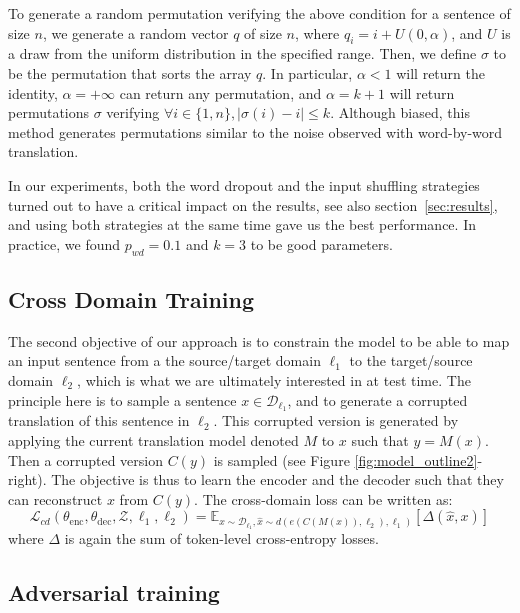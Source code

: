 \documentclass{article} \usepackage{iclr2018_conference,times}
\begin{document}
To generate a random permutation verifying the above condition for a sentence of size $n$, we generate a random vector $q$ of size $n$, where $q_i = i + U(0, \alpha)$, and $U$ is a draw from the uniform distribution in the specified range. Then, we define $\sigma$ to be the permutation that sorts the array $q$. In particular, $\alpha < 1$ will return the identity, $\alpha = +\infty$ can return any permutation, and $\alpha = k + 1$ will return permutations $\sigma$ verifying $\forall i \in \{1, n\}, | \sigma (i) - i | \leq k$. Although biased, this method generates permutations similar to the noise observed with word-by-word translation.

In our experiments, both the word dropout and the input shuffling strategies turned out to have a critical impact on the results, see also section~\ref{sec:results}, and using both strategies at the same time gave us the best performance. In practice, we found $p_{wd}=0.1$ and $k=3$ to be good parameters.

\subsection{Cross Domain Training}

 The second objective of our approach is to constrain the model to be able to map an input sentence from a the source/target domain $\ell_1$ to the target/source domain $\ell_2$, which is what we are ultimately interested in at test time. The principle here is to sample a sentence $x \in \mathcal{D}_{\ell_1}$, and to generate a corrupted translation of this sentence in $\ell_2$. This corrupted version is generated by applying the current translation model denoted $M$ to $x$ such that $y=M(x)$. Then a corrupted version $C(y)$ is sampled (see Figure \ref{fig:model_outline2}-right). The objective is thus to learn the encoder and the decoder such that they can reconstruct $x$ from $C(y)$. The cross-domain loss can be written as:
\begin{equation}
    \mathcal{L}_{cd}(\theta_\mathrm{enc},\theta_\mathrm{dec},\mathcal{Z},\ell_1,\ell_2)=\mathbb{E}_{x \sim \mathcal{D}_{\ell_1},\hat{x} \sim d(e(C(M(x)),\ell_2),\ell_1)} \left[ \Delta(\hat{x},x) \right] 
    \label{eq:xdomain}
\end{equation}
where $\Delta$ is again the sum of token-level cross-entropy losses.


\subsection{Adversarial training}
\end{document}
